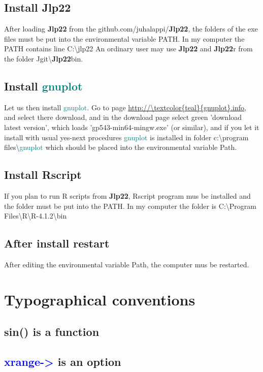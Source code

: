 \subsection{Install \textbf{Jlp22}} 
\label{installjlp22} 
After loading \textbf{Jlp22} from the github.com/juhalappi/\textbf{Jlp22}, the folders of the exe files must be 
put into the environmental variable PATH. In my computer the PATH contains line C:\textbackslash jlp22 
An ordinary user may use \textbf{Jlp22} and \textbf{Jlp22}r from the folder 
Jgit\textbackslash \textbf{Jlp22}bin. 
\subsection{Install \textcolor{teal}{gnuplot}} 
\label{installgnuplot} 
Let us then install \textcolor{teal}{gnuplot}. Go to page \url{http://\textcolor{teal}{gnuplot}.info}, and select there download, 
and in the download page select green 'download latest version', which loads 
'gp543-min64-mingw.exe' (or similar), and if you let it install with usual yes-next procedures 
\textcolor{teal}{gnuplot} is installed  in folder c:\textbackslash program files\textbackslash \textcolor{teal}{gnuplot} 
which should be placed into the environmental variable Path. 
\subsection{Install Rscript} 
\label{installrscript} 
 
If you plan to run R scripts from \textbf{Jlp22}, Rscript program mus be installed 
and the folder must be put into the PATH. In my computer the folder is 
C:\textbackslash Program Files\textbackslash R\textbackslash R-4.1.2\textbackslash bin 
\subsection{After install restart} 
\label{afterinstall} 
After editing the environmental variable Path, the computer mus be restarted. 
\section{Typographical conventions} 
\label{typo} 
\subsection{\textcolor{VioletRed}{sin}() is a function} 
\label{wrfunc} 
\subsection{\textcolor{blue}{xrange->} is an option} 
\label{wropt} 
